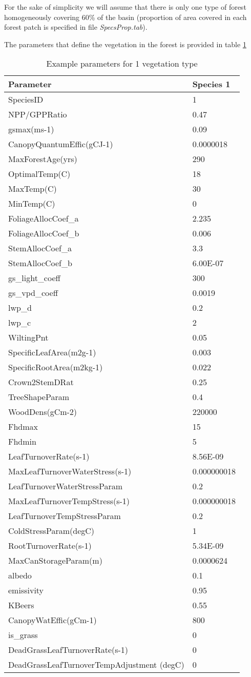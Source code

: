 For the sake of simplicity we will assume that there is only one type of forest homogeneously covering 60\% of the basin (proportion of area covered in each forest patch is specified in file \textit{SpecsProp.tab}). 

The parameters that define the vegetation in the forest is provided in table \ref{tab:exspecpars}

\begin{longtable}{|p{6.5cm}| l|}			
\caption{Example parameters for 1 vegetation type}			
\label{tab:exspecpars}\\			
\hline			
Parameter	&	Species 1	\\
\hline			
SpeciesID	&	1	\\
NPP/GPPRatio	&	0.47	\\
gsmax(ms-1)	&	0.09	\\
CanopyQuantumEffic(gCJ-1)	&	0.0000018	\\
MaxForestAge(yrs)	&	290	\\
OptimalTemp(C)	&	18	\\
MaxTemp(C)	&	30	\\
MinTemp(C)	&	0	\\
FoliageAllocCoef\_a	&	2.235	\\
FoliageAllocCoef\_b	&	0.006	\\
StemAllocCoef\_a	&	3.3	\\
StemAllocCoef\_b	&	6.00E-07	\\
gs\_light\_coeff	&	300	\\
gs\_vpd\_coeff	&	0.0019	\\
lwp\_d	&	0.2	\\
lwp\_c 	&	2	\\
WiltingPnt	&	0.05	\\
SpecificLeafArea(m2g-1)	&	0.003	\\
SpecificRootArea(m2kg-1)	&	0.022	\\
Crown2StemDRat	&	0.25	\\
TreeShapeParam	&	0.4	\\
WoodDens(gCm-2)	&	220000	\\
Fhdmax	&	15	\\
Fhdmin	&	5	\\
LeafTurnoverRate(s-1)	&	8.56E-09	\\
MaxLeafTurnoverWaterStress(s-1)	&	0.000000018	\\
LeafTurnoverWaterStressParam	&	0.2	\\
MaxLeafTurnoverTempStress(s-1)	&	0.000000018	\\
LeafTurnoverTempStressParam	&	0.2	\\
ColdStressParam(degC)	&	1	\\
RootTurnoverRate(s-1)	&	5.34E-09	\\
MaxCanStorageParam(m)	&	0.0000624	\\
albedo	&	0.1	\\
emissivity	&	0.95	\\
KBeers	&	0.55	\\
CanopyWatEffic(gCm-1)	&	800	\\
is\_grass	&	0	\\
DeadGrassLeafTurnoverRate(s-1)	&	0	\\
DeadGrassLeafTurnoverTempAdjustment (degC)	&	0	
\end{longtable}			

